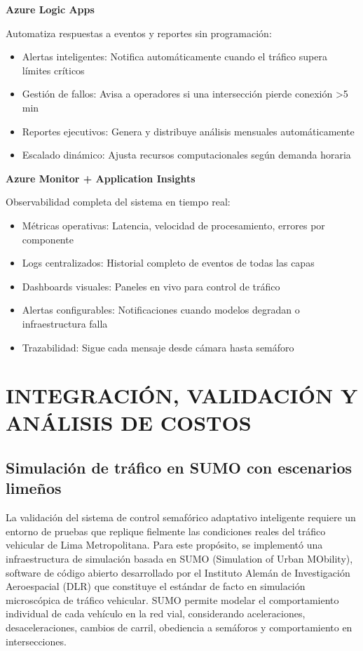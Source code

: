 \documentclass[12pt,a4paper,oneside]{report}
\begin{document}
\textbf{Azure Logic Apps}

Automatiza respuestas a eventos y reportes sin programación:

\begin{itemize}
\item
  Alertas inteligentes: Notifica automáticamente cuando el tráfico supera límites críticos
\item
  Gestión de fallos: Avisa a operadores si una intersección pierde conexión \textgreater5 min
\item
  Reportes ejecutivos: Genera y distribuye análisis mensuales automáticamente
\item
  Escalado dinámico: Ajusta recursos computacionales según demanda horaria
\end{itemize}

\textbf{Azure Monitor + Application Insights}

Observabilidad completa del sistema en tiempo real:

\begin{itemize}
\item
  Métricas operativas: Latencia, velocidad de procesamiento, errores por componente
\item
  Logs centralizados: Historial completo de eventos de todas las capas
\item
  Dashboards visuales: Paneles en vivo para control de tráfico
\item
  Alertas configurables: Notificaciones cuando modelos degradan o infraestructura falla
\item
  Trazabilidad: Sigue cada mensaje desde cámara hasta semáforo
\end{itemize}

\chapter{INTEGRACIÓN, VALIDACIÓN Y ANÁLISIS DE COSTOS}\label{capuxedtulo-7-integraciuxf3n-validaciuxf3n-y-anuxe1lisis-de-costos}

\section{Simulación de tráfico en SUMO con escenarios limeños}\label{simulaciuxf3n-de-truxe1fico-en-sumo-con-escenarios-limeuxf1os}

La validación del sistema de control semafórico adaptativo inteligente requiere un entorno de pruebas que replique fielmente las condiciones reales del tráfico vehicular de Lima Metropolitana. Para este propósito, se implementó una infraestructura de simulación basada en SUMO (Simulation of Urban MObility), software de código abierto desarrollado por el Instituto Alemán de Investigación Aeroespacial (DLR) que constituye el estándar de facto en simulación microscópica de tráfico vehicular. SUMO permite modelar el comportamiento individual de cada vehículo en la red vial, considerando aceleraciones, desaceleraciones, cambios de carril, obediencia a semáforos y comportamiento en intersecciones.
\end{document}
